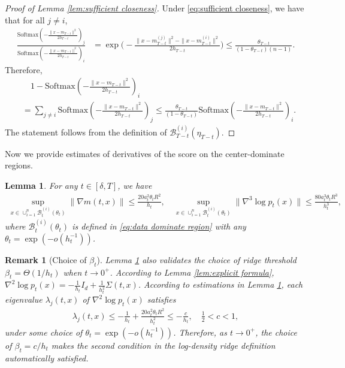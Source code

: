 \documentclass[11pt]{article}
\newcommand{\mc}{\mathcal}
\newcommand{\Softmax}{\mathrm{Softmax}}
\newtheorem{lemma}{Lemma}[section]
\newtheorem{remark}{Remark}[section]
\begin{document}
\begin{proof}[Proof of Lemma \ref{lem:sufficient closeness}] Under \eqref{eq:sufficient closeness}, we have that for all $j\neq i$,
\begin{align*}
    \frac{\Softmax(-\frac{\| x-m_{T-t} \|^2}{2h_{T-t}})_j}{\Softmax(-\frac{\| x-m_{T-t} \|^2}{2h_{T-t}})_i} & =\exp\big( -\frac{\| x-m_{T-t}^{(j)}\|^2-\| x-m_{T-t}^{(i)} \|^2}{2h_{T-t}} \big) \le \frac{\theta_{T-t}}{(1-\theta_{T-t})(n-1)}.
\end{align*}
Therefore,
\begin{align*}
    &\quad 1-\Softmax(-\frac{\| x-m_{T-t} \|^2}{2h_{T-t}})_i\\
    & = \sum_{j\neq i}\Softmax(-\frac{\| x-m_{T-t} \|^2}{2h_{T-t}})_j  \le \frac{\theta_{T-t}}{(1-\theta_{T-t})} \Softmax(-\frac{\| x-m_{T-t} \|^2}{2h_{T-t}})_i.
\end{align*}
The statement follows from the definition of $\mc{B}_{T-t}^{(i)}(\eta_{T-t})$.
\end{proof}
Now we provide estimates of derivatives of the score on the center-dominate regions.
\begin{lemma}\label{lem:important estimate} For any $t\in [\delta,T]$, we have
\begin{align*}
    \sup_{x\in \cup_{i=1}^n \mc{B}_{t}^{(i)}(\theta_{t})} \| \nabla m(t,x) \|\le \frac{20a_t^2 \theta_t R^2}{h_t},\quad  \sup_{x\in \cup_{i=1}^n \mc{B}_{t}^{(i)}(\theta_{t})}\| \nabla^3 \log p_t(x) \|\le \frac{80 a_t^3\theta_t R^3}{h_t^{3}},
\end{align*} 
where $\mc{B}_{t}^{(i)}(\theta_{t})$ is defined in \eqref{eq:data dominate region} with any $\theta_t=\exp(- o(h_{t}^{-1}) )$.
\end{lemma}
\begin{remark}[Choice of $\beta_t$]\label{rem:choice of beta} Lemma \ref{lem:important estimate} also validates the choice of ridge threshold $\beta_t=\Theta(1/h_t)$ when $t\to 0^+$. According to Lemma \ref{lem:explicit formula}, $\nabla^2\log p_t(x) = -\tfrac{1}{h_t}I_d + \tfrac{1}{h_t^2}\Sigma(t,x)$. According to estimations in Lemma \ref{lem:important estimate}, each eigenvalue $\lambda_j(t,x)$ of $\nabla^2\log p_t(x)$ satisfies
\begin{align*}
    \lambda_j(t,x) \le -\frac{1}{h_t} + \frac{20a_t^2 \theta_t R^2 }{h_t^2} \le -\frac{c}{h_t}, \quad \frac{1}{2}<c<1,
\end{align*}
under some choice of $\theta_t=\exp(- o(h_{t}^{-1}) )$. Therefore, as $t\to 0^+$, the choice of $\beta_t=c/h_t$ makes the second condition in the log-density ridge definition automatically satisfied.    
\end{remark}
\end{document}
